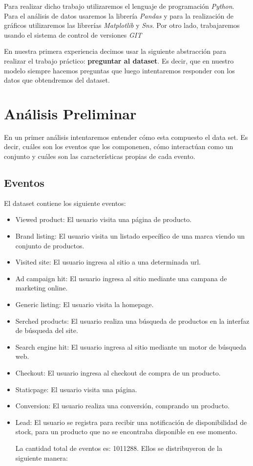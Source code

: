 \documentclass[titlepage,a4paper]{article}
\begin{document}
	Para realizar dicho trabajo utilizaremos el lenguaje de programación \textit{Python}. Para el análisis de datos usaremos la librería \textit{Pandas} y para la realización de gráficos utilizaremos las librerías \textit{Matplotlib }y \textit{Sns}. Por otro lado, trabajaremos usando el sistema de control de versiones \textit{GIT}	
	
	En nuestra primera experiencia decimos usar la siguiente abstracción para realizar el trabajo práctico: \textbf{preguntar al dataset}. Es decir, que en nuestro modelo siempre hacemos preguntas que luego intentaremos responder con los datos que obtendremos del dataset. 
	
	\section{Análisis Preliminar}
	En un primer análisis intentaremos entender cómo esta compuesto el data set. Es decir, cuáles son los eventos que los componenen, cómo interactúan como un conjunto y cuáles son las características propias de cada evento. 
	\subsection{Eventos}
	El dataset contiene los siguiente eventos: 
	\begin{itemize}
	\item Viewed product: El usuario visita una página de producto.
	\item Brand listing: El usuario visita un listado específico de una marca viendo un conjunto de productos.
	\item Visited site: El usuario ingresa al sitio a una determinada url.
	\item Ad campaign hit:  El usuario ingresa al sitio mediante una campana de marketing online.
	\item Generic listing:  El usuario visita la homepage.
	\item Serched products:  El usuario realiza una búsqueda de productos en la interfaz de búsqueda del site.
	\item Search engine hit: El usuario ingresa al sitio mediante un motor de búsqueda web.
	\item Checkout: El usuario ingresa al checkout de compra de un producto.
	\item Staticpage: El usuario visita una página.
	\item Conversion: El usuario realiza una conversión, comprando un producto.
	\item Lead: El usuario se registra para recibir una notificación de disponibilidad de stock, para un producto que no se encontraba disponible en ese momento.
	
	\newpage
	La cantidad total de eventos es: 	1011288. Ellos se distribuyeron de la siguiente manera:
	\end{itemize}
	
\end{document}
